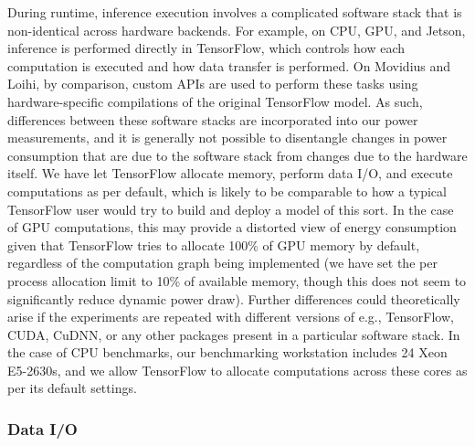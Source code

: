 \documentclass[sigconf, screen]{acmart}
\begin{document}
During runtime, inference execution involves a complicated software stack that is non-identical across hardware backends. For example, on CPU, GPU, and Jetson, inference is performed directly in TensorFlow, which controls how each computation is executed and how data transfer is performed. On Movidius and Loihi, by comparison, custom APIs are used to perform these tasks using hardware-specific compilations of the original TensorFlow model. As such, differences between these software stacks are incorporated into our power measurements, and it is generally not possible to disentangle changes in power consumption that are due to the software stack from changes due to the hardware itself. We have let TensorFlow allocate memory, perform data I/O, and execute computations as per default, which is likely to be comparable to how a typical TensorFlow user would try to build and deploy a model of this sort. In the case of GPU computations, this may provide a distorted view of energy consumption given that TensorFlow tries to allocate 100\% of GPU memory by default, regardless of the computation graph being implemented (we have set the per process allocation limit to 10\% of available memory, though this does not seem to significantly reduce dynamic power draw). Further differences could theoretically arise if the experiments are repeated with different versions of e.g., TensorFlow, CUDA, CuDNN, or any other packages present in a particular software stack. In the case of CPU benchmarks, our benchmarking workstation includes 24 Xeon E5-2630s, and we allow TensorFlow to allocate computations across these cores as per its default settings. 


\subsubsection{Data I/O}
\end{document}
